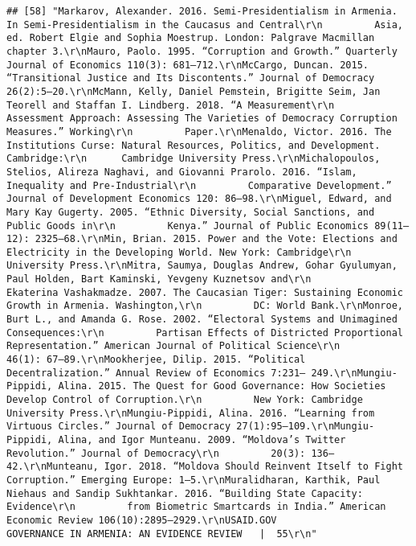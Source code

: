 \documentclass[
]{article}
\begin{document}
\begin{verbatim}
## [58] "Markarov, Alexander. 2016. Semi-Presidentialism in Armenia. In Semi-Presidentialism in the Caucasus and Central\r\n         Asia, ed. Robert Elgie and Sophia Moestrup. London: Palgrave Macmillan chapter 3.\r\nMauro, Paolo. 1995. “Corruption and Growth.” Quarterly Journal of Economics 110(3): 681–712.\r\nMcCargo, Duncan. 2015. “Transitional Justice and Its Discontents.” Journal of Democracy 26(2):5–20.\r\nMcMann, Kelly, Daniel Pemstein, Brigitte Seim, Jan Teorell and Staffan I. Lindberg. 2018. “A Measurement\r\n         Assessment Approach: Assessing The Varieties of Democracy Corruption Measures.” Working\r\n         Paper.\r\nMenaldo, Victor. 2016. The Institutions Curse: Natural Resources, Politics, and Development. Cambridge:\r\n      Cambridge University Press.\r\nMichalopoulos, Stelios, Alireza Naghavi, and Giovanni Prarolo. 2016. “Islam, Inequality and Pre-Industrial\r\n         Comparative Development.” Journal of Development Economics 120: 86–98.\r\nMiguel, Edward, and Mary Kay Gugerty. 2005. “Ethnic Diversity, Social Sanctions, and Public Goods in\r\n         Kenya.” Journal of Public Economics 89(11–12): 2325–68.\r\nMin, Brian. 2015. Power and the Vote: Elections and Electricity in the Developing World. New York: Cambridge\r\n         University Press.\r\nMitra, Saumya, Douglas Andrew, Gohar Gyulumyan, Paul Holden, Bart Kaminski, Yevgeny Kuznetsov and\r\n         Ekaterina Vashakmadze. 2007. The Caucasian Tiger: Sustaining Economic Growth in Armenia. Washington,\r\n         DC: World Bank.\r\nMonroe, Burt L., and Amanda G. Rose. 2002. “Electoral Systems and Unimagined Consequences:\r\n         Partisan Effects of Districted Proportional Representation.” American Journal of Political Science\r\n         46(1): 67–89.\r\nMookherjee, Dilip. 2015. “Political Decentralization.” Annual Review of Economics 7:231– 249.\r\nMungiu-Pippidi, Alina. 2015. The Quest for Good Governance: How Societies Develop Control of Corruption.\r\n         New York: Cambridge University Press.\r\nMungiu-Pippidi, Alina. 2016. “Learning from Virtuous Circles.” Journal of Democracy 27(1):95–109.\r\nMungiu-Pippidi, Alina, and Igor Munteanu. 2009. “Moldova’s Twitter Revolution.” Journal of Democracy\r\n         20(3): 136–42.\r\nMunteanu, Igor. 2018. “Moldova Should Reinvent Itself to Fight Corruption.” Emerging Europe: 1–5.\r\nMuralidharan, Karthik, Paul Niehaus and Sandip Sukhtankar. 2016. “Building State Capacity: Evidence\r\n         from Biometric Smartcards in India.” American Economic Review 106(10):2895–2929.\r\nUSAID.GOV                                                      GOVERNANCE IN ARMENIA: AN EVIDENCE REVIEW   |  55\r\n"                                                                                                                                                                                                                                                                                                                                                                                                                                                                                                                                                                                                                                                                          
\end{verbatim}
\end{document}
